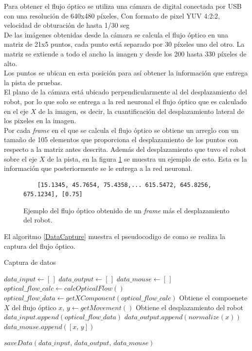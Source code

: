 \documentclass{iccmemoria}
\begin{document}
Para obtener el flujo óptico se utiliza una cámara de digital conectada por USB con una resolución de 640x480 píxeles, Con formato de pixel YUV 4:2:2, velocidad de obturación de hasta 1/30 seg\\

De las imágenes obtenidas desde la cámara se calcula el flujo óptico en una matriz de 21x5 puntos, cada punto está separado por 30 píxeles uno del otro. La matriz se extiende a todo el ancho la imagen y desde los 200 hasta 330 píxeles de alto.\\

Los puntos se ubican en esta posición para así obtener la información que entrega la pista de pruebas.\\

El plano de la cámara está ubicado perpendicularmente al del desplazamiento del robot, por lo que solo se entrega a la red neuronal el flujo óptico que es calculado en el eje $X$ de la imagen, es decir, la cuantificación del desplazamiento lateral de los pixeles en la imagen.\\

Por cada \emph{frame} en el que se calcula el flujo óptico se obtiene un arreglo con un tamaño de 105 elementos que proporciona el desplazamiento de los puntos con respecto a la matriz antes descrita. Además del desplazamiento que tuvo el robot sobre el eje $X$ de la pista, en la figura \ref{fig:optical_flow} se muestra un ejemplo de esto. Esta es la información que posteriormente se le entrega a la red neuronal.\\

\begin{figure}[H]
\centering
\begin{verbatim}
	[15.1345, 45.7654, 75.4358,... 615.5472, 645.8256, 675.1234], [0.75]
\end{verbatim}
\caption[Captura del flujo óptico de un \emph{frame}.]{Ejemplo del flujo óptico obtenido de un \emph{frame} más el desplazamiento del robot.}
  \label{fig:optical_flow}
\end{figure}

El algoritmo \ref{DataCapture} muestra el pseudocodigo de como se realiza la captura del flujo óptico.\\

\begin{algorithm}[H]
\caption{Captura de datos}\label{DataCapture}
\begin{algorithmic}[1]
\State $data\_input \gets [\,]$
\State $data\_output \gets [\,]$
\State $data\_mouse \gets [\,]$
\State $optical\_flow\_calc \gets calcOpticalFlow()$ 
\State $optical\_flow\_data \gets getXComponent(optical\_flow\_calc)$ \Comment Obtiene el compoenete $X$ del flujo óptico
\State $x,\, y \gets getMovement()$ \Comment Obtiene el desplazamiento del robot
\State $data\_input.append(optical\_flow\_data)$
\State $data\_output.append(normalize(x))$
\State $data\_mouse.append([x,\, y])$
\EndWhile

\State $saveData(data\_input,\, data\_output,\, data\_mouse)$
\EndFunction
\end{algorithmic}
\end{algorithm}
\end{document}
